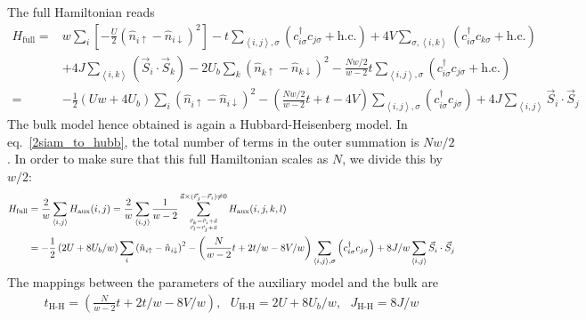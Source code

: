 \documentclass[10pt]{report}
\numberwithin{equation}{section}
\begin{document}
 The full Hamiltonian reads
\begin{equation}\begin{aligned}
	H_\text{full} =& w\sum_i\left[- \frac{U}{2}\left(\hat n_{i \uparrow} - \hat n_{i \downarrow}\right)^2\right] - t\sum_{\left<i,j \right>,\sigma}\left(c^\dagger_{i\sigma}c_{j\sigma} + \text{h.c.}\right) + 4V\sum_{\sigma, \left<i,k\right>}\left(c^\dagger_{i\sigma}c_{k\sigma} + \text{h.c.}\right)\\
		      &+ 4J \sum_{\left<i,k\right>}\left(\vec{S}_{i}\cdot\vec{S}_{k}\right) - 2 U_b\sum_k\left(\hat n_{k \uparrow} - \hat n_{k \downarrow}\right)^2 - \frac{Nw/2}{w-2}t\sum_{\left<i,j \right>,\sigma}\left(c^\dagger_{i\sigma}c_{j\sigma} + \text{h.c.}\right)\\
	=& -\frac{1}{2}\left(Uw + 4U_b\right)\sum_i \left(\hat n_{i \uparrow} - \hat n_{i \downarrow}\right)^2 - \left(\frac{Nw/2}{w-2}t + t - 4V\right) \sum_{\left<i,j \right>,\sigma}\left(c^\dagger_{i\sigma}c_{j\sigma}\right) + 4J \sum_{\left<i,j \right>} \vec{S}_i\cdot\vec{S}_j
\end{aligned}\end{equation}
The bulk model hence obtained is again a Hubbard-Heisenberg model. In eq.~\ref{2siam_to_hubb}, the total number of terms in the outer summation is \(Nw/2\). In order to make sure that this full Hamiltonian scales as \(N\), we divide this by \(w/2\):
\begin{equation}\begin{aligned}
	\label{2siam_to_hubb}
	H_\text{full} &= \frac{2}{w}\sum_{\left<i,j\right>} H_\text{aux}(i,j) = \frac{2}{w}\sum_{\left<i,j\right>}\frac{1}{w - 2}\sum_{\vec r_k = \vec r_i + \vec a \atop{\vec r_l = \vec r_j + \vec a}}^{\vec a \times \left(\vec r_j - \vec r_i\right) \neq 0}H_\text{aux}(i,j,k,l)\\
		      &= -\frac{1}{2}\left(2U + 8U_b/w\right)\sum_i \left(\hat n_{i \uparrow} - \hat n_{i \downarrow}\right)^2 - \left(\frac{N}{w-2}t + 2t/w - 8V/w\right) \sum_{\left<i,j \right>,\sigma}\left(c^\dagger_{i\sigma}c_{j\sigma}\right) + 8J/w \sum_{\left<i,j \right>} \vec{S}_i\cdot\vec{S}_j
\end{aligned}\end{equation}
The mappings between the parameters of the auxiliary model and the bulk are
\begin{equation}\begin{aligned}
	t_\text{H-H} = \left(\frac{N}{w-2}t + 2t/w - 8V/w\right),~ ~ ~ U_\text{H-H} = 2U + 8U_b/w,~ ~ ~ J_\text{H-H} = 8J/w
\end{aligned}\end{equation}
\end{document}
